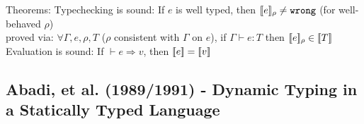 \documentclass[12pt]{article}	%
\begin{document}
Theorems: Typechecking is sound: If $e$ is well typed, then $[\![e]\!]_\rho \neq \texttt{wrong}$ (for well-behaved $\rho$)\\
	                             proved via: $\forall\Gamma,e,\rho,T$ ($\rho$ consistent with $\Gamma$ on $e$), if $\Gamma\vdash e:T$ then $[\![e]\!]_\rho \in [\![T]\!]$\\
	      Evaluation is sound: If $\vdash e \Rightarrow v$, then $[\![e]\!] = [\![v]\!]$


\subsection*{Abadi, et al. (1989/1991) - Dynamic Typing in a Statically Typed Language}
\end{document}
